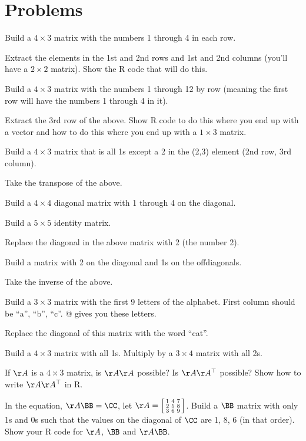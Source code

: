 \clearpage
\renewcommand{\rightmark}{}
\section*{Problems}

\begin{hwenumerate} 
\item Build a $4 \times 3$ matrix with the numbers 1 through 4 in each row.
\item Extract the elements in the 1st and 2nd rows and 1st and 2nd columns (you'll have a $2 \times 2$ matrix). Show the R code that will do this.
\item Build a $4 \times 3$ matrix with the numbers 1 through 12 by row (meaning the first row will have the numbers 1 through 4 in it).
\item Extract the 3rd row of the above.  Show R code to do this where you end up with a vector and how to do this where you end up with a $1 \times 3$ matrix.
\item Build a $4 \times 3$ matrix that is all 1s except a 2 in the (2,3) element (2nd row, 3rd column).
\item Take the transpose of the above.
\item Build a $4 \times 4$ diagonal matrix with 1 through 4 on the diagonal.
\item Build a $5 \times 5$ identity matrix.
\item Replace the diagonal in the above matrix with 2 (the number 2).
\item Build a matrix with 2 on the diagonal and 1s on the offdiagonals.
\item Take the inverse of the above.
\item Build a $3 \times 3$ matrix with the first 9 letters of the alphabet.  First column should be ``a'', ``b'', ``c''.  \verb@letters[1:9]@ gives you these letters.
\item Replace the diagonal of this matrix with the word ``cat''.
\item Build a $4 \times 3$ matrix with all 1s. Multiply by a $3 \times 4$ matrix with all 2s.
\item If $\AA$ is a $4 \times 3$ matrix, is $\AA \AA$ possible? Is $\AA  \AA^\top$ possible?  Show how to write $\AA\AA^\top$ in R.
\item In the equation, $\AA \BB = \CC$, let $\AA=\left[ \begin{smallmatrix}1&4&7\\2&5&8\\3&6&9\end{smallmatrix}\right]$.  Build a $\BB$ matrix with only 1s and 0s such that the values on the diagonal of $\CC$ are 1, 8, 6 (in that order).  Show your R code for $\AA$, $\BB$ and $\AA \BB$.

\end{hwenumerate}
